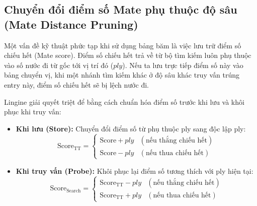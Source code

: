 \subsection{Chuyển đổi điểm số Mate phụ thuộc độ sâu (Mate Distance Pruning)}

Một vấn đề kỹ thuật phức tạp khi sử dụng bảng băm là việc lưu trữ điểm số chiếu hết (Mate score). Điểm số chiếu hết trả về từ bộ tìm kiếm luôn phụ thuộc vào số nước đi từ gốc tới vị trí đó ($ply$). Nếu ta lưu trực tiếp điểm số này vào bảng chuyển vị, khi một nhánh tìm kiếm khác ở độ sâu khác truy vấn trúng entry này, điểm số chiếu hết sẽ bị lệch nước đi.

Lingine giải quyết triệt để bằng cách chuẩn hóa điểm số trước khi lưu và khôi phục khi truy vấn:
\begin{itemize}
    \item \textbf{Khi lưu (Store):} Chuyển đổi điểm số từ phụ thuộc ply sang độc lập ply:
    \[ \text{Score}_{\text{TT}} = \begin{cases} 
      \text{Score} + ply & (\text{nếu thắng chiếu hết}) \\
      \text{Score} - ply & (\text{nếu thua chiếu hết}) 
   \end{cases} \]
    \item \textbf{Khi truy vấn (Probe):} Khôi phục lại điểm số tương thích với ply hiện tại:
    \[ \text{Score}_{\text{Search}} = \begin{cases} 
      \text{Score}_{\text{TT}} - ply & (\text{nếu thắng chiếu hết}) \\
      \text{Score}_{\text{TT}} + ply & (\text{nếu thua chiếu hết}) 
   \end{cases} \]
\end{itemize}
